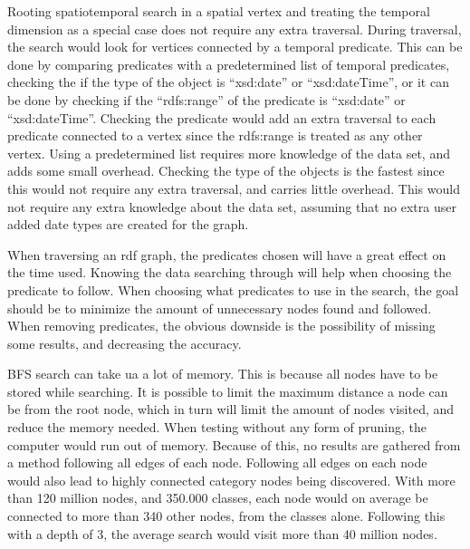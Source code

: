 Rooting spatiotemporal search in a spatial vertex and treating the temporal dimension as a special case does not require any extra traversal. During traversal, the search would look for vertices connected by a temporal predicate. This can be done by comparing predicates with a predetermined list of temporal predicates, checking the if the type of the object is ``xsd:date'' or ``xsd:dateTime'', or it can be done by checking if the ``rdfs:range'' of the predicate is ``xsd:date'' or ``xsd:dateTime''. Checking the predicate would add an extra traversal to each predicate connected to a vertex since the rdfs:range is treated as any other vertex. Using a predetermined list requires more knowledge of the data set, and adds some small overhead. Checking the type of the objects is the fastest since this would not require any extra traversal, and carries little overhead. This would not require any extra knowledge about the data set, assuming that no extra user added date types are created for the graph.

When traversing an rdf graph, the predicates chosen will have a great effect on the time used. 
Knowing the data searching through will help when choosing the predicate to follow. 
When choosing what predicates to use in the search, the goal should be to minimize the amount of unnecessary nodes found and followed. 
When removing predicates, the obvious downside is the possibility of missing some results, and decreasing the accuracy.

BFS search can take ua a lot of memory. This is because all nodes have to be stored while searching. It is possible to limit the maximum distance a node can be from the root node, which in turn will limit the amount of nodes visited, and reduce the memory needed. When testing without any form of pruning, the computer would run out of memory. Because of this, no results are gathered from a method following all edges of each node. Following all edges on each node would also lead to highly connected category nodes being discovered. With more than 120 million nodes, and 350.000 classes, each node would on average be connected to more than 340 other nodes, from the classes alone. Following this with a depth of 3, the average search would visit more than 40 million nodes.

